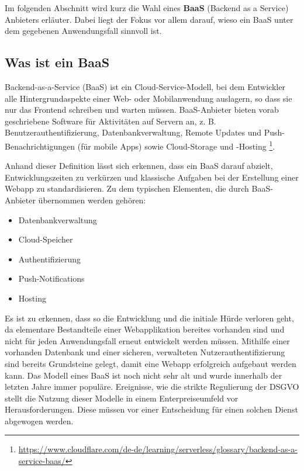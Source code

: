 
Im folgenden Abschnitt wird kurz die Wahl eines \textbf{BaaS} (Backend as a Service) Anbieters erläuter. Dabei liegt der Fokus vor allem darauf, wieso ein BaaS unter dem gegebenen Anwendungsfall sinnvoll ist.

\subsection{Was ist ein BaaS}
\begin{definition}
    Backend-as-a-Service (BaaS) ist ein Cloud-Service-Modell, bei dem Entwickler alle Hintergrundaspekte einer Web- oder Mobilanwendung auslagern, so dass sie nur das Frontend schreiben und warten müssen. BaaS-Anbieter bieten vorab geschriebene Software für Aktivitäten auf Servern an, z. B. Benutzerauthentifizierung, Datenbankverwaltung, Remote Updates und Push-Benachrichtigungen (für mobile Apps) sowie Cloud-Storage und -Hosting 
    \footnote{\url{https://www.cloudflare.com/de-de/learning/serverless/glossary/backend-as-a-service-baas/}}.

    Anhand dieser Definition lässt sich erkennen, dass ein BaaS darauf abzielt, Entwicklungszeiten zu verkürzen und klassische Aufgaben bei der Erstellung einer Webapp zu standardisieren. Zu dem typischen Elementen, die durch BaaS-Anbieter übernommen werden gehören:
    \begin{itemize}
        \item Datenbankverwaltung
        \item Cloud-Speicher
        \item Authentifizierung
        \item Push-Notifications
        \item Hosting
    \end{itemize}

    Es ist zu erkennen, dass so die Entwicklung und die initiale Hürde verloren geht, da elementare Bestandteile einer Webapplikation bereites vorhanden sind und nicht für jeden Anwendungsfall erneut entwickelt werden müssen. Mithilfe einer vorhanden Datenbank und einer sicheren, verwalteten Nutzerauthentifizierung sind bereits Grundsteine gelegt, damit eine Webapp erfolgreich aufgebaut werden kann. Das Modell eines BaaS ist noch nicht sehr alt und wurde innerhalb der letzten Jahre immer populäre. Ereignisse, wie die strikte Regulierung der DSGVO stellt die Nutzung dieser Modelle in einem Enterpreiseumfeld vor Herausforderungen. Diese müssen vor einer Entscheidung für einen solchen Dienst abgewogen werden.


\end{definition}

